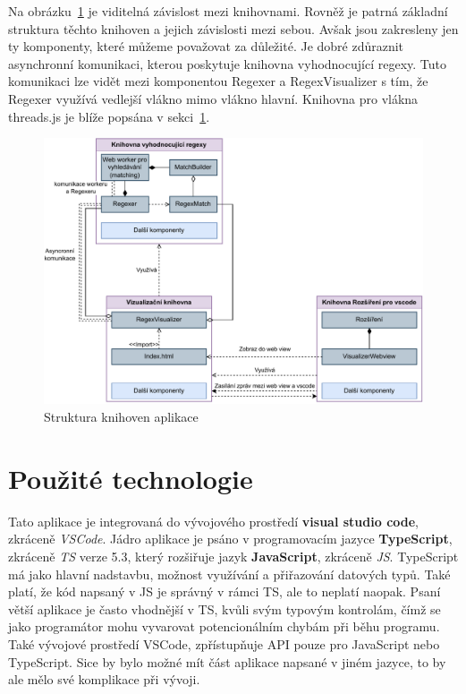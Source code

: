 Na obrázku~\ref{fig:ARCH} je viditelná závislost mezi knihovnami. 
Rovněž je patrná základní struktura těchto knihoven a jejich závislosti mezi sebou.
Avšak jsou zakresleny jen ty komponenty, které můžeme považovat za důležité. 
Je dobré zdůraznit asynchronní komunikaci, kterou poskytuje knihovna vyhodnocující regexy.
Tuto komunikaci lze vidět mezi komponentou Regexer a RegexVisualizer s tím, že Regexer využívá vedlejší vlákno mimo vlákno hlavní. 
Knihovna pro vlákna threads.js je blíže popsána v sekci~\ref{sec:USEDtech}.

\begin{figure}[!h]
	\centering
	\includegraphics[width=.9\textwidth]{Figures/BP-Arch.pdf}
	\caption{Struktura knihoven aplikace}
	\label{fig:ARCH}
\end{figure}

\newpage

\section{Použité technologie}\label{sec:USEDtech}
Tato aplikace je integrovaná do vývojového prostředí \textbf{visual studio code}, zkráceně \textit{VSCode}. 
Jádro aplikace je psáno v programovacím jazyce \textbf{TypeScript}, zkráceně \textit{TS} verze 5.3, který rozšiřuje jazyk \textbf{JavaScript}, zkráceně \textit{JS}. 
TypeScript má jako hlavní nadstavbu, možnost využívání a přiřazování datových typů.
Také platí, že kód napsaný v JS je správný v rámci TS, ale to neplatí naopak.
Psaní větší aplikace je často vhodnější v TS, kvůli svým typovým kontrolám, čímž se jako programátor mohu vyvarovat potencionálním chybám při běhu programu.
Také vývojové prostředí VSCode, zpřístupňuje API pouze pro JavaScript nebo TypeScript.
Sice by bylo možné mít část aplikace napsané v jiném jazyce, to by ale mělo své komplikace při vývoji.

